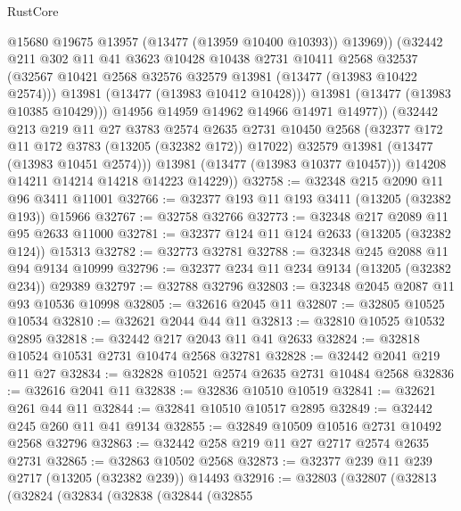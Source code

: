 \begin{lexlean}{RustCore}
\begin{coremodule}
                    @15680
                    @19675
                    @13957
                    (@13477 (@13959 @10400 @10393))
                    @13969))
                (@32442
                  @211
                  @302
                  @11
                  @41
                  @3623
                  @10428
                  @10438
                  @2731
                  @10411
                  @2568
                  @32537
                  (@32567 @10421 @2568 @32576 @32579 @13981 (@13477 (@13983 @10422 @2574)))
                  @13981
                  (@13477 (@13983 @10412 @10428)))
                @13981
                (@13477 (@13983 @10385 @10429)))
              @14956
              @14959
              @14962
              @14966
              @14971
              @14977))
          (@32442
            @213
            @219
            @11
            @27
            @3783
            @2574
            @2635
            @2731
            @10450
            @2568
            (@32377 @172 @11 @172 @3783 (@13205 (@32382 @172)) @17022)
            @32579
            @13981
            (@13477 (@13983 @10451 @2574)))
          @13981
          (@13477 (@13983 @10377 @10457)))
        @14208
        @14211
        @14214
        @14218
        @14223
        @14229))
@32758 := @32348 @215 @2090 @11 @96 @3411 @11001
@32766 := @32377 @193 @11 @193 @3411 (@13205 (@32382 @193)) @15966
@32767 := @32758 @32766
@32773 := @32348 @217 @2089 @11 @95 @2633 @11000
@32781 := @32377 @124 @11 @124 @2633 (@13205 (@32382 @124)) @15313
@32782 := @32773 @32781
@32788 := @32348 @245 @2088 @11 @94 @9134 @10999
@32796 := @32377 @234 @11 @234 @9134 (@13205 (@32382 @234)) @29389
@32797 := @32788 @32796
@32803 := @32348 @2045 @2087 @11 @93 @10536 @10998
@32805 := @32616 @2045 @11
@32807 := @32805 @10525 @10534
@32810 := @32621 @2044 @44 @11
@32813 := @32810 @10525 @10532 @2895
@32818 := @32442 @217 @2043 @11 @41 @2633
@32824 := @32818 @10524 @10531 @2731 @10474 @2568 @32781
@32828 := @32442 @2041 @219 @11 @27
@32834 := @32828 @10521 @2574 @2635 @2731 @10484 @2568
@32836 := @32616 @2041 @11
@32838 := @32836 @10510 @10519
@32841 := @32621 @261 @44 @11
@32844 := @32841 @10510 @10517 @2895
@32849 := @32442 @245 @260 @11 @41 @9134
@32855 := @32849 @10509 @10516 @2731 @10492 @2568 @32796
@32863 := @32442 @258 @219 @11 @27 @2717 @2574 @2635 @2731
@32865 := @32863 @10502 @2568
@32873 := @32377 @239 @11 @239 @2717 (@13205 (@32382 @239)) @14493
@32916 := @32803
    (@32807
      (@32813
        (@32824
          (@32834
            (@32838
              (@32844
                (@32855

\end{coremodule}
\end{lexlean}
